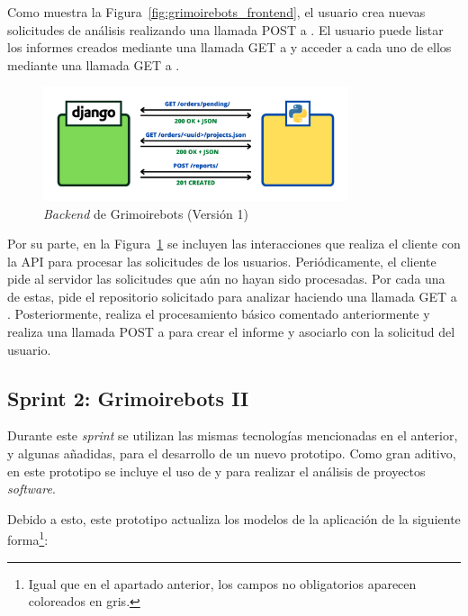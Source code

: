 Como muestra la Figura~\ref{fig:grimoirebots_frontend}, el usuario crea nuevas solicitudes de análisis realizando una llamada POST a . El usuario puede listar los informes creados mediante una llamada GET a  y acceder a cada uno de ellos mediante una llamada GET a .

\begin{figure}[ht]
    \centering
    \includegraphics[width=0.8\textwidth]{Figures/grimoirebots_i_backend}
    \decoRule
    \caption[Grimoirebots I (\emph{Backend})]{\emph{Backend} de Grimoirebots (Versión 1)}
    \label{fig:grimoirebots_i_backend}
\end{figure}

Por su parte, en la Figura~\ref{fig:grimoirebots_i_backend} se incluyen las interacciones que realiza el cliente con la API para procesar las solicitudes de los usuarios. Periódicamente, el cliente pide al servidor las solicitudes que aún no hayan sido procesadas. Por cada una de estas, pide el repositorio solicitado para analizar haciendo una llamada GET a . Posteriormente, realiza el procesamiento básico comentado anteriormente y realiza una llamada POST a  para crear el informe y asociarlo con la solicitud del usuario.

\subsection{Sprint 2: Grimoirebots II}

Durante este \emph{sprint} se utilizan las mismas tecnologías mencionadas en el anterior, y algunas añadidas, para el desarrollo de un nuevo prototipo. Como gran aditivo, en este prototipo se incluye el uso de  y  para realizar el análisis de proyectos \emph{software}.

Debido a esto, este prototipo actualiza los modelos de la aplicación de la siguiente forma\footnote{Igual que en el apartado anterior, los campos no obligatorios aparecen coloreados en gris.}:

